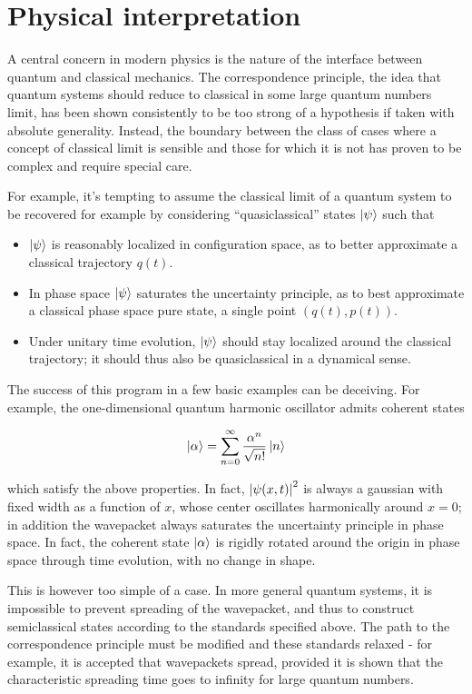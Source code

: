 \documentclass{article}
\begin{document}
\section{Physical interpretation}

A central concern in modern physics is the nature of the interface between quantum and classical mechanics. The correspondence principle, the idea that quantum systems should reduce to classical in some large quantum numbers limit, has been shown consistently to be too strong of a hypothesis if taken with absolute generality. Instead, the boundary between the class of cases where a concept of classical limit is sensible and those for which it is not has proven to be complex and require special care.

For example, it's tempting to assume the classical limit of a quantum system to be recovered for example by considering ``quasiclassical'' states $\ket \psi$ such that

\begin{itemize}
    \item $\ket \psi$ is reasonably localized in configuration space, as to better approximate a classical trajectory $q(t)$.
    \item In phase space $\ket \psi$ saturates the uncertainty principle, as to best approximate a classical phase space pure state, a single point $(q(t),p(t))$.
    \item Under unitary time evolution, $\ket \psi$ should stay localized around the classical trajectory; it should thus also be quasiclassical in a dynamical sense.
\end{itemize}

The success of this program in a few basic examples can be deceiving. For example, the one-dimensional quantum harmonic oscillator admits coherent states

\begin{equation}
    \ket\alpha = \sum_{n=0}^{\infty} \frac{\alpha^n}{\sqrt{n!}} \ket n
\end{equation}

which satisfy the above properties. In fact, $\abs{\psi(x,t)}^2$ is always a gaussian with fixed width as a function of $x$, whose center oscillates harmonically around $x=0$; in addition the wavepacket always saturates the uncertainty principle in phase space. In fact, the coherent state $\ket \alpha$ is rigidly rotated around the origin in phase space through time evolution, with no change in shape.

This is however too simple of a case. In more general quantum systems, it is impossible to prevent spreading of the wavepacket, and thus to construct semiclassical states according to the standards specified above. The path to the correspondence principle must be modified and these standards relaxed - for example, it is accepted that wavepackets spread, provided it is shown that the characteristic spreading time goes to infinity for large quantum numbers.
\end{document}
